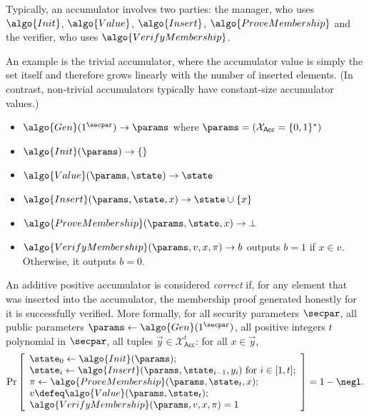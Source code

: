 Typically, an accumulator involves two parties: the manager, who uses $\algo{Init}$, $\algo{Value}$, $\algo{Insert}$, $\algo{ProveMembership}$ and the verifier, who uses $\algo{VerifyMembership}$.

\begin{example}
  An example is the trivial accumulator\label{sec:trivial-acc}, where the accumulator value is simply the set itself and therefore grows linearly with the number of inserted elements.
  (In contrast, non-trivial accumulators typically have constant-size accumulator values.)
  \begin{itemize}
    \item $\algo{Gen}(1^\secpar)\rightarrow \params$ where $\params = (\mathcal{X}_\mathsf{Acc} = \{0,1\}^*)$
    \item $\algo{Init}(\params)\rightarrow \{\}$
    \item $\algo{Value}(\params, \state)\rightarrow \state$
    \item $\algo{Insert}(\params, \state, x) \rightarrow \state \cup \{x\}$
    \item $\algo{ProveMembership}(\params, \state, x) \rightarrow \bot$
    \item $\algo{VerifyMembership}(\params, v, x, \pi) \rightarrow b$ outputs $b = 1$ if $x \in v$. Otherwise, it outputs $b = 0$.
  \end{itemize}
\end{example}

\begin{definition}[Correctness]
An additive positive accumulator is considered \emph{correct} if, for any element that was inserted into the accumulator, the membership proof generated honestly for it is successfully verified.
More formally, for all security parameters $\secpar$, all public parameters $\params \gets \algo{Gen}(1^\secpar)$, all positive integers $t$ polynomial in $\secpar$, all tuples $\vec{y} \in \mathcal{X}_\mathsf{Acc}^{t}$: for all $x \in \vec{y}$,
\[
    \Pr\left[
    \begin{array}{l}
        \state_0 \gets \algo{Init}(\params); \\
        \state_i \gets \algo{Insert}(\params, \state_{i - 1}, y_i) \text{ for } i \in [1, t]; \\
        \pi \gets \algo{ProveMembership}(\params, \state_t, x); \\
        v \defeq \algo{Value}(\params, \state_t); \\
        \algo{VerifyMembership}(\params, v, x, \pi) = 1
    \end{array}
    \right] = 1 - \negl.
\]
\end{definition}

